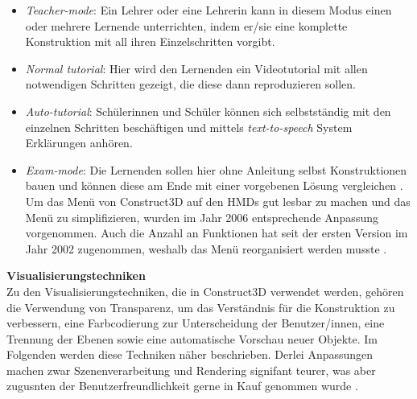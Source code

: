 \documentclass[deutsch]{llncs}
\begin{document}
\begin{itemize}
\item \emph{Teacher-mode}:
Ein Lehrer oder eine Lehrerin kann in diesem Modus einen oder mehrere Lernende unterrichten, indem er/sie eine komplette Konstruktion mit all ihren Einzelschritten vorgibt. 
\item \emph{Normal tutorial}:
Hier wird den Lernenden ein Videotutorial mit allen notwendigen Schritten gezeigt, die diese dann reproduzieren sollen. 
\item \emph{Auto-tutorial}:
Schülerinnen und Schüler können sich selbstständig mit den einzelnen Schritten beschäftigen und mittels \emph{text-to-speech} System Erklärungen anhören. 
\item \emph{Exam-mode}: 
Die Lernenden sollen hier ohne Anleitung selbst Konstruktionen bauen und können diese am Ende mit einer vorgebenen Lösung vergleichen \cite{article}. 
Um das Menü von Construct3D auf den HMDs gut lesbar zu machen und das Menü zu simplifizieren, wurden im Jahr 2006 entsprechende Anpassung vorgenommen. Auch die Anzahl an Funktionen hat seit  der ersten Version im Jahr 2002 zugenommen, weshalb das Menü reorganisiert werden musste \cite{1667626}. \\\end{itemize}
\textbf{Visualisierungstechniken} \\
Zu den Visualisierungstechniken, die in Construct3D verwendet werden, gehören die Verwendung von Transparenz, um das Verständnis für die Konstruktion zu verbessern, eine Farbcodierung zur Unterscheidung der Benutzer/innen, eine Trennung der Ebenen sowie eine automatische Vorschau neuer Objekte. Im Folgenden werden diese Techniken näher beschrieben. Derlei Anpassungen machen zwar Szenenverarbeitung und Rendering signifant teurer, was aber zugusnten der Benutzerfreundlichkeit gerne in Kauf genommen wurde \cite{1667626}. 
\end{document}
